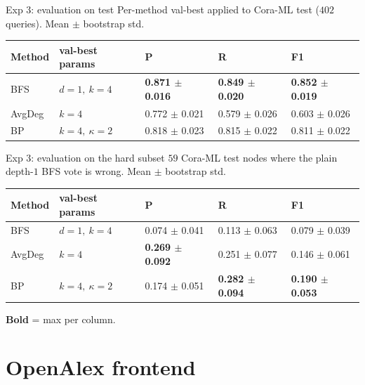 \documentclass{beamer}
\begin{document}
\begin{frame}{Exp 3: evaluation on test}
  Per-method val-best applied to Cora-ML test ($402$ queries). Mean $\pm$ bootstrap std.

  \vfill

  \scriptsize
  \begin{center}
  \begin{tabular}{lllll}
    \toprule
    Method & val-best params           & P     & R     & F1 \\
    \midrule
    BFS    & $d = 1,\ k = 4$           & \textbf{0.871 $\pm$ 0.016} & \textbf{0.849 $\pm$ 0.020} & \textbf{0.852 $\pm$ 0.019} \\
    AvgDeg & $k = 4$                   & 0.772 $\pm$ 0.021 & 0.579 $\pm$ 0.026 & 0.603 $\pm$ 0.026 \\
    BP     & $k = 4,\ \kappa = 2$      & 0.818 $\pm$ 0.023 & 0.815 $\pm$ 0.022 & 0.811 $\pm$ 0.022 \\
    \bottomrule
  \end{tabular}
  \end{center}

\end{frame}

\begin{frame}{Exp 3: evaluation on the hard subset}
  $59$ Cora-ML test nodes where the plain depth-$1$ BFS vote is wrong. Mean $\pm$ bootstrap std.

  \vfill

  \scriptsize
  \begin{center}
  \begin{tabular}{lllll}
    \toprule
    Method & val-best params           & P     & R     & F1 \\
    \midrule
    BFS    & $d = 1,\ k = 4$           & 0.074 $\pm$ 0.041 & 0.113 $\pm$ 0.063 & 0.079 $\pm$ 0.039 \\
    AvgDeg & $k = 4$                   & \textbf{0.269 $\pm$ 0.092} & 0.251 $\pm$ 0.077 & 0.146 $\pm$ 0.061 \\
    BP     & $k = 4,\ \kappa = 2$      & 0.174 $\pm$ 0.051 & \textbf{0.282 $\pm$ 0.094} & \textbf{0.190 $\pm$ 0.053} \\
    \bottomrule
  \end{tabular}
  \end{center}

  \vfill

  \scriptsize \textbf{Bold} = max per column.
\end{frame}

\section{OpenAlex frontend}
\end{document}
